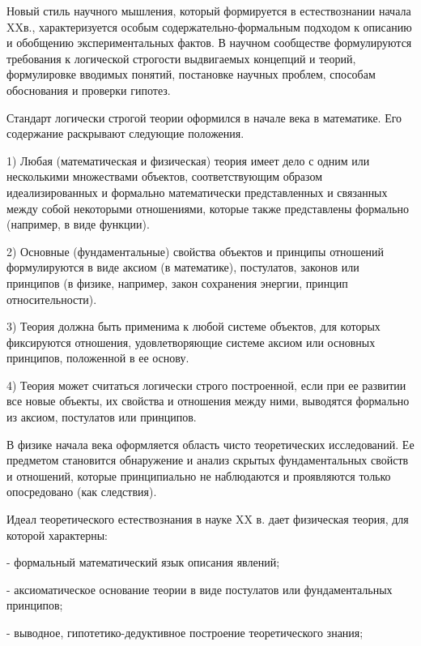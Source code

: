 \documentclass[exam_answers.tex]{subfiles}
\begin{document}
\renewcommand{\baselinestretch}{\blch}

Новый стиль научного мышления, который формируется в естествознании
начала XXв., характеризуется особым содержательно-формальным подходом к
описанию и обобщению экспериментальных фактов. В научном сообществе
формулируются требования к логической строгости выдвигаемых концепций и
теорий, формулировке вводимых понятий, постановке научных проблем,
способам обоснования и проверки гипотез.

Стандарт логически строгой теории оформился в начале века в
математике. Его содержание раскрывают следующие положения.

1) Любая (математическая и физическая) теория имеет дело с одним
или несколькими множествами объектов, соответствующим образом
идеализированных и формально математически представленных и связанных
между собой некоторыми отношениями, которые также представлены
формально (например, в виде функции).

2) Основные (фундаментальные) свойства объектов и принципы
отношений формулируются в виде аксиом (в математике), постулатов, законов
или принципов (в физике, например, закон сохранения энергии, принцип
относительности).

3) Теория должна быть применима к любой системе объектов, для
которых фиксируются отношения, удовлетворяющие системе аксиом или
основных принципов, положенной в ее основу.

4) Теория может считаться логически строго построенной, если при ее
развитии все новые объекты, их свойства и отношения между ними, выводятся
формально из аксиом, постулатов или принципов.

В физике начала века оформляется область чисто теоретических
исследований. Ее предметом становится обнаружение и анализ скрытых
фундаментальных свойств и отношений, которые принципиально не
наблюдаются и проявляются только опосредовано (как следствия).

Идеал теоретического естествознания в науке XX в. дает физическая
теория, для которой характерны:

- формальный математический язык описания явлений;

- аксиоматическое основание теории в виде постулатов или
фундаментальных принципов;

- выводное, гипотетико-дедуктивное построение теоретического знания;
\end{document}
